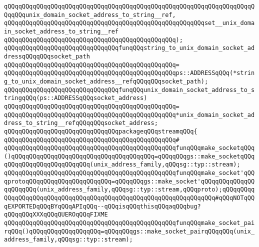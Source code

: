 \verb|qQQqqQQqqQQqqQQqqQQqqQQqqQQqqQQqqQQqqQQqqQQqqQQqqQQqqQQqqQQqqQQqqQQqqQQqqQQqunix_domain_socket_address_to_string__ref,|\newline
\verb|qQQqqQQqqQQqqQQqqQQqqQQqqQQqqQQqqQQqqQQqqQQqqQQqqQQqqQQqset__unix_domain_socket_address_to_string__ref|\newline
\verb|qQQqqQQqqQQqqQQqqQQqqQQqqQQqqQQqqQQqqQQqqQQqqQQq);|\newline
\newline
\newline
\verb|qQQqqQQqqQQqqQQqqQQqqQQqqQQqqQQqfunqQQqstring_to_unix_domain_socket_addressqQQqqQQqsocket_path|\newline
\verb|qQQqqQQqqQQqqQQqqQQqqQQqqQQqqQQqqQQqqQQqqQQqqQQq=|\newline
\verb|qQQqqQQqqQQqqQQqqQQqqQQqqQQqqQQqqQQqqQQqqQQqqQQqps::ADDRESSqQQq(*string_to_unix_domain_socket_address__refqQQqqQQqsocket_path);|\newline
\newline
\verb|qQQqqQQqqQQqqQQqqQQqqQQqqQQqqQQqfunqQQqunix_domain_socket_address_to_stringqQQq(ps::ADDRESSqQQqsocket_address)|\newline
\verb|qQQqqQQqqQQqqQQqqQQqqQQqqQQqqQQqqQQqqQQqqQQqqQQq=|\newline
\verb|qQQqqQQqqQQqqQQqqQQqqQQqqQQqqQQqqQQqqQQqqQQqqQQq*unix_domain_socket_address_to_string__refqQQqqQQqsocket_address;|\newline
\newline
\newline
\verb|qQQqqQQqqQQqqQQqqQQqqQQqqQQqqQQqpackageqQQqstreamqQQq{|\newline
\verb|qQQqqQQqqQQqqQQqqQQqqQQqqQQqqQQqqQQqqQQqqQQqqQQq#|\newline
\verb|qQQqqQQqqQQqqQQqqQQqqQQqqQQqqQQqqQQqqQQqqQQqqQQqfunqQQqmake_socketqQQq()qQQqqQQqqQQqqQQqqQQqqQQqqQQqqQQqqQQqqQQq=qQQqqQQqgs::make_socketqQQqqQQqqQQqqQQqqQQqqQQqqQQq(unix_address_family,qQQqsg::typ::stream);|\newline
\verb|qQQqqQQqqQQqqQQqqQQqqQQqqQQqqQQqqQQqqQQqqQQqqQQqfunqQQqmake_socket'qQQqprotoqQQqqQQqqQQqqQQqqQQqqQQq=qQQqqQQqgs::make_socket'qQQqqQQqqQQqqQQqqQQqqQQq(unix_address_family,qQQqsg::typ::stream,qQQqproto);qQQqqQQqqQQqqQQqqQQqqQQqqQQqqQQqqQQqqQQqqQQqqQQqqQQqqQQqqQQqqQQqqQQq#qQQqNOTqQQqEXPORTEDqQQqBYqQQqAPIqQQq--qQQqisqQQqthisqQQqaqQQqbug?qQQqqQQqXXXqQQqQUEROqQQqFIXME|\newline
\verb|qQQqqQQqqQQqqQQqqQQqqQQqqQQqqQQqqQQqqQQqqQQqqQQqfunqQQqmake_socket_pairqQQq()qQQqqQQqqQQqqQQqqQQq=qQQqqQQqgs::make_socket_pairqQQqqQQq(unix_address_family,qQQqsg::typ::stream);|\newline
